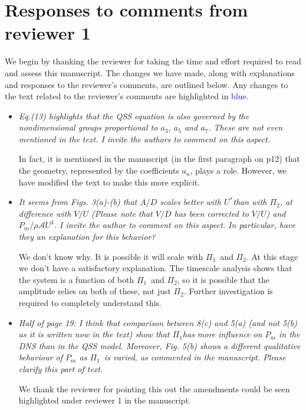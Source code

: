 \documentclass[]{article}
\newcommand{\ustar}{\ensuremath{U^{*}}}
\newcommand{\massstiff}{\ensuremath{\Pi_1}}
\newcommand{\massdamp}{\ensuremath{\Pi_2}}
\begin{document}
\section*{Responses to comments from reviewer 1}

We begin by thanking the reviewer for taking the time and effort
required to read and assess this manuscript. The changes we have made, along with explanations and
responses to the reviewer's comments, are outlined below. Any changes to the text related to the reviewer's comments are highlighted in
\textcolor{blue}{blue}.

\begin{itemize}
\item \emph{Eq.(13) highlights that the QSS equation is also governed by the nondimensional
	groups proportional to $a_3$, $a_5$ and $a_7$. These are not even
	mentioned in the text. I invite the authors to comment on this aspect.}

In fact, it is mentioned in the manuscript (in the first paragraph on p12) that the geometry, represented by the coefficients $a_n$, plays a role. However, we have modified the text to make this more explicit.

\item \emph{It seems from Figs. 3(a)-(b) that $A/D$ scales better with \ustar than with \massdamp, at difference with $V/U$ (Please note that $V/D$ has been corrected to $V/U$) and $P_m/\rho \mathcal{A}U^3$. I invite the author to comment on this aspect. In particular, have they an explanation for this behavior?}

We don't know why. It is possible it will scale with \massstiff \ and \massdamp. 
At this stage we don't have a satisfactory explanation.  The timescale analysis shows that the system is a function of both \massstiff \ and \massdamp, so it is possible that the amplitude relies on both of these, not just \massdamp. Further investigation is required to completely understand this. 

\item \emph{ Half of page 19: I think that comparison between 8(c) and 5(a) (and not 5(b) as it is written now in the text) show that \massstiff has more influence on $P_m$ in the DNS than in the QSS model. Moreover, Fig. 5(b) shows a different qualitative behaviour of $P_m$ as \massstiff \ is varied, as commented in the manuscript. Please clarify this part of text.}

We thank the reviewer for pointing this out the amendments could be seen highlighted under reviewer 1 in the manuscript.


\end{itemize}
\end{document}
